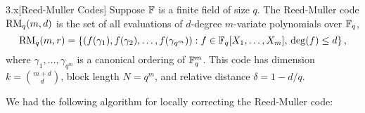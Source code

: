 \documentclass[11pt]{article}
\begin{document}
\begin{definition}{3.x}[Reed-Muller Codes]
    Suppose $\mathbb{F}$ is a finite field of size $q$. The Reed-Muller code $\mathrm{RM}_q(m, d)$ is the set of all evaluations of $d$-degree $m$-variate polynomials over $\mathbb{F}_q$,
    \begin{equation*}
        \mathrm{RM}_q(m ,r) = \left\{(f(\gamma_1), f(\gamma_2), \ldots, f(\gamma_{q^m})) : f \in \mathbb{F}_q[X_1, \ldots, X_m], \, \deg (f) \leq d\right\},
    \end{equation*}
    where $\gamma_1, \ldots, \gamma_{q^m}$ is a canonical ordering of $\mathbb{F}_q^m$. This code has dimension $k = \binom{m + d}{d}$, block length $N = q^m$, and relative distance $\delta = 1 - d/ q$.
\end{definition}

We had the following algorithm for locally correcting the Reed-Muller code:
\end{document}
